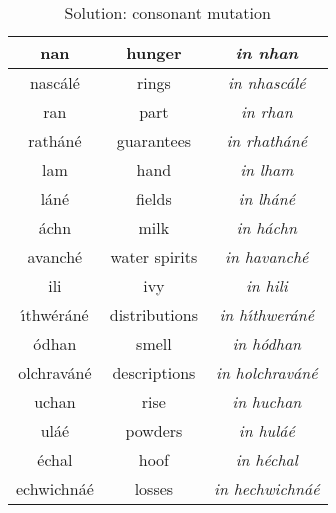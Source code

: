 \begin{table}[H]
{{\begin{tabular}{|c|c|>{\itshape}c|}
      \midrule
      nan & hunger & in nhan\\
      \midrule
      nasc\'{a}l\'{e} & rings & in nhasc\'{a}l\'{e}\\
      \midrule
      ran & part & in rhan\\
      \midrule
      rath\'{a}n\'{e} & guarantees & in rhath\'{a}n\'{e}\\
      \midrule
      lam & hand & in lham\\
      \midrule
      l\'{a}n\'{e} & fields & in lh\'{a}n\'{e}\\
      \midrule
      \'{a}chn & milk & in h\'{a}chn\\
      \midrule
      avanch\'{e} & water spirits & in havanch\'{e}\\
      \midrule
      ili & ivy & in hili\\
      \midrule
      \'{\i}thw\'{e}r\'{a}n\'{e} & distributions & in h\'{\i}thwer\'{a}n\'{e}\\
      \midrule
      \'{o}dhan & smell & in h\'{o}dhan\\
      \midrule
      olchrav\'{a}n\'{e} & descriptions & in holchrav\'{a}n\'{e}\\
      \midrule
      uchan & rise & in huchan\\
      \midrule
      ul\'{a}\'{e} & powders & in hul\'{a}\'{e}\\
      \midrule
      \'{e}chal & hoof & in h\'{e}chal\\
      \midrule
      echwichn\'{a}\'{e} & losses & in hechwichn\'{a}\'{e}\\
      \bottomrule
    \end{tabular}
  }
}
\label{solution_consonant_mutation}
\caption{Solution: consonant mutation}
\end{table}
